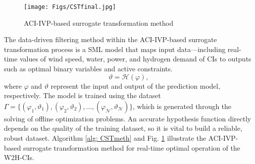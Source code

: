 \documentclass[conference]{IEEEtran}
\begin{document}
\begin{figure}[!t]  
    \vspace{-.35cm}
  \centering
\texttt{[image: Figs/CSTfinal.jpg]}
 \centering
     \vspace{-.25cm}
    \caption{ACI-IVP-based surrogate transformation method}
  \label{pic: CST} 
  \vspace{-.55cm}
\end{figure} 

The data-driven filtering method within the ACI-IVP-based surrogate transformation process is a SML model that maps input data—including real-time values of wind speed, water, power, and hydrogen demand of CIs to outputs such as optimal binary variables and active constraints.
\begin{equation} \label{eq_map} 
\vartheta = \mathcal{H}(\varphi), \end{equation}
where $\varphi$ and $\vartheta$ represent the input and output of the prediction model, respectively. The model is trained using the dataset $\Gamma =\{(\varphi_1,\vartheta_1),(\varphi_2,\vartheta_2),...,(\varphi_{\mathcal{N}},\vartheta_{\mathcal{N}})\}$, which is generated through the solving of offline optimization problems. An accurate hypothesis function directly depends on the quality of the training dataset, so it is vital to build a reliable, robust dataset. Algorithm \ref{alg: CSTmeth} and Fig. \ref{pic: CST} illustrate the ACI-IVP-based surrogate transformation method for real-time optimal operation of the W2H-CIs.
\end{document}

